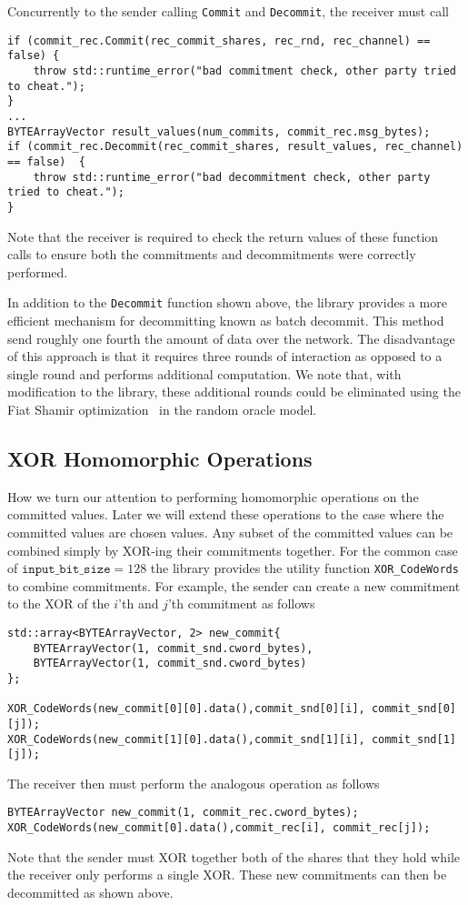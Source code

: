 Concurrently to the sender calling \texttt{Commit} and \texttt{Decommit}, the receiver must call 
\begin{lstlisting}     
if (commit_rec.Commit(rec_commit_shares, rec_rnd, rec_channel) == false) {
	throw std::runtime_error("bad commitment check, other party tried to cheat.");
}
...
BYTEArrayVector result_values(num_commits, commit_rec.msg_bytes);
if (commit_rec.Decommit(rec_commit_shares, result_values, rec_channel) == false)  {
	throw std::runtime_error("bad decommitment check, other party tried to cheat.");
}
\end{lstlisting}
Note that the receiver is required to check the return values of these function calls to ensure both the commitments and decommitments were correctly performed.

In addition to the \texttt{Decommit} function shown above, the library provides a more efficient mechanism for decommitting known as batch decommit. This method send roughly one fourth the amount of data over the network. The disadvantage of this approach is that it requires three rounds of interaction as opposed to a single round and performs additional computation. We note that, with modification to the library, these additional rounds could be eliminated using the Fiat Shamir optimization~\cite{DBLP:conf/crypto/FiatS86} in the random oracle model.

\subsection{XOR Homomorphic Operations}


How we turn our attention to performing homomorphic operations on the committed values. Later we will extend these operations to the case where the committed values are chosen values. Any subset of the committed values can be combined simply by XOR-ing their commitments together. For the common case of $\texttt{input\_bit\_size} =128$ the library provides the utility function \texttt{XOR\_CodeWords} to combine commitments. For example, the sender can create a new commitment to the XOR of the $i$'th and $j$'th  commitment as follows
\begin{lstlisting}     
std::array<BYTEArrayVector, 2> new_commit{
	BYTEArrayVector(1, commit_snd.cword_bytes),
	BYTEArrayVector(1, commit_snd.cword_bytes)
};

XOR_CodeWords(new_commit[0][0].data(),commit_snd[0][i], commit_snd[0][j]);
XOR_CodeWords(new_commit[1][0].data(),commit_snd[1][i], commit_snd[1][j]);
\end{lstlisting}
The receiver then must perform the analogous operation as follows
\begin{lstlisting}     
BYTEArrayVector new_commit(1, commit_rec.cword_bytes);
XOR_CodeWords(new_commit[0].data(),commit_rec[i], commit_rec[j]);
\end{lstlisting}
Note that the sender must XOR together both of the shares that they hold while the receiver only performs a single XOR. These new commitments can then be decommitted as shown above.

